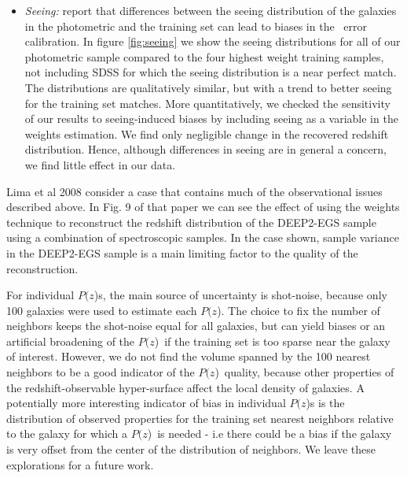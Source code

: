 \documentclass[12pt,preprint]{aastex}
\newcommand{\pofz}{$P(z$)}
\begin{document}
\begin{itemize}
\item {\it Seeing: } \citet{Nakajima11} report that differences
between the seeing distribution of the galaxies in the photometric and the
training set can lead to biases in the \photoz\ error calibration.  In figure
\ref{fig:seeing} we show the seeing distributions for all of our photometric
sample compared to the four highest weight training samples, not including SDSS
for which the seeing distribution is a near perfect match.  The distributions
are qualitatively similar, but with a trend to better seeing for the training
set matches.  More quantitatively, we checked the sensitivity of our results to
seeing-induced biases by including seeing as a variable in the weights
estimation.  We find only negligible change in the recovered redshift
distribution.  Hence, although differences in seeing are in general a concern, we
find little effect in our data.
\end{itemize}

Lima et al 2008 consider a case that contains much of the observational issues
described above.  In Fig. 9 of that paper we can see the effect of using the
weights technique to reconstruct the redshift distribution of the DEEP2-EGS
sample using a combination of spectroscopic samples.  In the case shown, sample
variance in the DEEP2-EGS sample is a main limiting factor to the quality of
the reconstruction.

For individual \pofz s, the main source of uncertainty is shot-noise, because
only 100 galaxies were used to estimate each \pofz.  The choice to fix the
number of neighbors keeps the shot-noise equal for all galaxies, but can 
yield biases or an artificial broadening of the \pofz\ if the training set is
too sparse near the galaxy of interest.  However, we do not find the volume
spanned by the 100 nearest neighbors to be a good indicator of the \pofz\
quality, because other properties of the redshift-observable
hyper-surface affect the local density of galaxies.  A potentially more
interesting indicator of bias in individual \pofz s is the distribution of
observed properties for the training set nearest neighbors relative to the
galaxy for which a \pofz\ is needed - i.e there could be a bias if the galaxy
is very offset from the center of the distribution of neighbors. We leave these
explorations for a future work.
\end{document}
